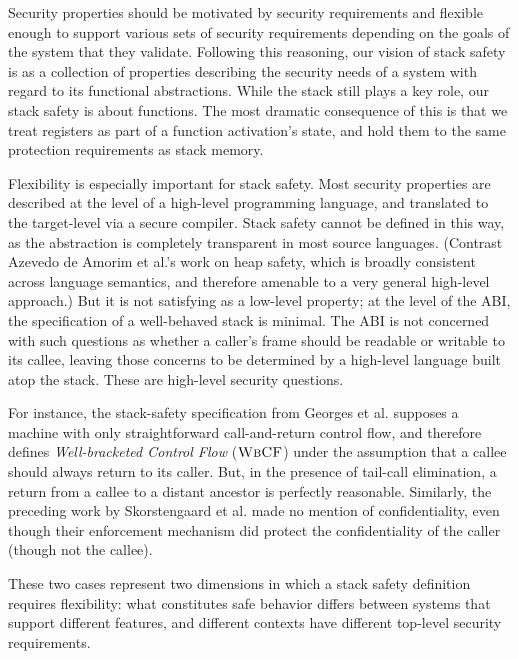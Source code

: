 \documentclass[10pt,conference]{ieeetran}%
\theoremstyle{definition}
\begin{document}

Security properties should be motivated by security requirements
and flexible enough to support various sets of security requirements depending on the
goals of the system that they validate.
Following this reasoning, our vision of stack safety is as a collection of properties
describing the security needs of a system with regard to its functional abstractions.
While the stack still plays a key role, our stack safety is about functions. The most
dramatic consequence of this is that we treat registers as part of a function activation's
state, and hold them to the same protection requirements as stack memory.

Flexibility is especially important for stack safety.
%
Most security properties are described at the level of a high-level programming language,
and translated to the target-level via a secure compiler. Stack safety cannot
be defined in this way, as the abstraction is completely transparent in most source languages.
(Contrast Azevedo de Amorim et al.'s \cite{DBLP:conf/post/AmorimHP18} work on heap safety,
which is broadly consistent across language semantics, and therefore
amenable to a very general high-level approach.)
%
But it is not satisfying as a low-level property; at the level of the ABI, the
specification of a well-behaved stack is minimal. The ABI is not concerned with such
questions as whether a caller's frame should be readable or writable to its callee,
leaving those concerns to be determined by a high-level language built atop the stack.
These are high-level security questions.

For instance, the stack-safety specification from Georges et al.
\cite{Georges22:TempsDesCerises} supposes a machine with only straightforward call-and-return
control flow, and therefore defines {\em Well-bracketed Control Flow} (\(\textnormal{\sc WbCF}\)) under the assumption that
a callee should always return to its caller. But, in the presence of tail-call elimination, a
return from a callee to a distant ancestor is perfectly reasonable. Similarly, the preceding work by
Skorstengaard et al. \cite{SkorstengaardSTKJFP} made no mention of confidentiality, even though
their enforcement mechanism did protect the confidentiality of the caller (though not the callee).

These two cases represent two dimensions in which a stack safety definition requires
flexibility: what constitutes safe behavior differs between systems that support different
features, and different contexts have different top-level security requirements.
\end{document}
